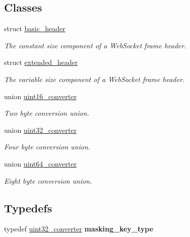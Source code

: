 \subsection*{Classes}
\begin{DoxyCompactItemize}
\item 
struct \hyperlink{structwebsocketpp_1_1frame_1_1basic__header}{basic\+\_\+header}
\begin{DoxyCompactList}\small\item\em The constant size component of a Web\+Socket frame header. \end{DoxyCompactList}\item 
struct \hyperlink{structwebsocketpp_1_1frame_1_1extended__header}{extended\+\_\+header}
\begin{DoxyCompactList}\small\item\em The variable size component of a Web\+Socket frame header. \end{DoxyCompactList}\item 
union \hyperlink{unionwebsocketpp_1_1frame_1_1uint16__converter}{uint16\+\_\+converter}
\begin{DoxyCompactList}\small\item\em Two byte conversion union. \end{DoxyCompactList}\item 
union \hyperlink{unionwebsocketpp_1_1frame_1_1uint32__converter}{uint32\+\_\+converter}
\begin{DoxyCompactList}\small\item\em Four byte conversion union. \end{DoxyCompactList}\item 
union \hyperlink{unionwebsocketpp_1_1frame_1_1uint64__converter}{uint64\+\_\+converter}
\begin{DoxyCompactList}\small\item\em Eight byte conversion union. \end{DoxyCompactList}\end{DoxyCompactItemize}
\subsection*{Typedefs}
\begin{DoxyCompactItemize}
\item 
typedef \hyperlink{unionwebsocketpp_1_1frame_1_1uint32__converter}{uint32\+\_\+converter} {\bfseries masking\+\_\+key\+\_\+type}\hypertarget{namespacewebsocketpp_1_1frame_a8bdac8ec44c78c027fcf55aa3bad3f86}{}\label{namespacewebsocketpp_1_1frame_a8bdac8ec44c78c027fcf55aa3bad3f86}

\end{DoxyCompactItemize}
